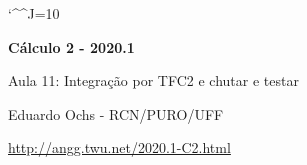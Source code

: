 \documentclass[oneside,12pt]{article}
\begin{document}
\catcode`\^^J=10


\long{}
\long{}
\long{}
\long{}
\long{}
\long{}
\long{}
\long{}
\long{}
\long{}

\long{}
\long{}

\def\frown{\ensuremath{{=}{(}}}
\def\True {\mathbf{V}}
\def\False{\mathbf{F}}
\def\Subst#1{\bmat{#1}}

\def\drafturl{http://angg.twu.net/LATEX/2020-1-C2.pdf}
\def\drafturl{http://angg.twu.net/2020.1-C2.html}
\def\draftfooter{\tiny \href{\drafturl}{\jobname{}} \ColorBrown{\shorttoday{} \hours}}



%

\thispagestyle{empty}

\begin{center}

\vspace*{1.2cm}

{\bf \Large Cálculo 2 - 2020.1}

\bsk

Aula 11: Integração por TFC2 e chutar e testar

\bsk

Eduardo Ochs - RCN/PURO/UFF

\url{http://angg.twu.net/2020.1-C2.html}

\end{center}
\end{document}
